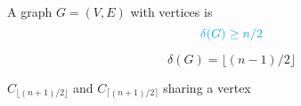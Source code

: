 \begin{frame}{}
  \begin{theorem}
    A  graph $G = (V, E)$
    with  vertices is 
    \[
      \textcolor{cyan}{\delta(G) \ge n/2}
    \]
  \end{theorem}

  \pause
  \[
    \delta(G) = \lfloor (n-1)/2 \rfloor
  \]

  \pause
  \vspace{0.30cm}
  \begin{center}
    $C_{\lfloor (n + 1)/ 2 \rfloor}$ and $C_{\lceil (n+1)/2 \rceil}$
    sharing a vertex
  \end{center}
\end{frame}

